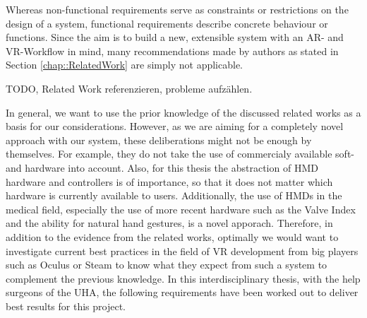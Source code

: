 Whereas non-functional requirements serve as constraints or restrictions on the design of a system, functional requirements describe concrete behaviour or functions.
Since the aim is to build a new, extensible system with an AR- and VR-Workflow in mind, many recommendations made by authors as stated in Section \ref{chap::RelatedWork} are simply not applicable.

TODO, Related Work referenzieren, probleme aufzählen.

In general, we want to use the prior knowledge of the discussed related works as a basis for our considerations. However, as we are aiming for a completely novel approach with our system, these deliberations might not be enough by themselves.
For example, they do not take the use of commercialy available soft- and hardware into account.
Also, for this thesis the abstraction of HMD hardware and controllers is of importance, so that it does not matter which hardware is currently available to users.
Additionally, the use of HMDs in the medical field, especially the use of more recent hardware such as the Valve Index and the ability for natural hand gestures, is a novel apporach.
Therefore, in addition to the evidence from the related works, optimally we would want to investigate current best practices in the field of VR development from big players such as Oculus or Steam to know what they expect from such a system to complement the previous knowledge.
In this interdisciplinary thesis, with the help surgeons of the UHA, the following requirements have been worked out to deliver best results for this project. 

